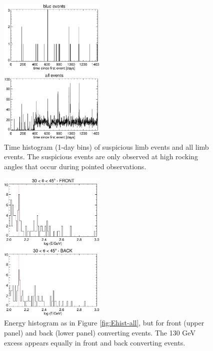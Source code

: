\documentclass[aps,twocolumn,prd,superscriptaddress,showpacs,nofootinbib,fixfloat]{revtex4}
\begin{document}
\begin{figure}
  \centering
  \includegraphics[width=0.45\textwidth]{plots/timehist.ps}
  \caption{Time histogram (1-day bins) of suspicious limb
  events and all limb events.  The suspicious events are
  only observed at high rocking angles that occur during
  pointed observations.}
  \label{fig:timehist}
\end{figure}

\begin{figure}
  \centering
  \includegraphics[width=0.45\textwidth]{plots/Ehist-frontback.ps}
  \caption{Energy histogram as in Figure
  \ref{fig:Ehist-all}, but for front (upper panel) and back
  (lower panel) converting events. The 130 GeV excess
  appears equally in front and back converting events.}
  \label{fig:Ehist-frontback}
\end{figure}
\end{document}
